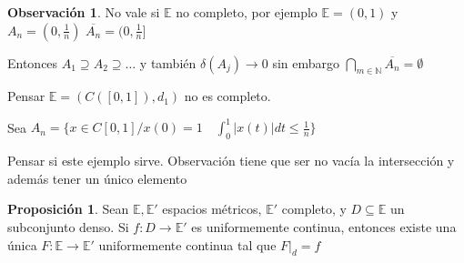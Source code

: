 \documentclass[12pt]{article}
\newcommand{\E}{\mathbb{E}}
\newcommand{\N}{\mathbb{N}}
\newcommand{\ra}{\rightarrow}
\newcommand{\ol}{\overline}
\theoremstyle{definition}
\newtheorem*{remark}{Observación}
\newtheorem{prop}{Proposición}
\begin{document}
\begin{remark}
  No vale si $\E$ no completo, por ejemplo $\E = (0,1)$ y $A_n = (0, \frac{1}{n})$ $\ol{A_n} = (0,\frac{1}{n}]$ 

  Entonces $A_1 \supseteq A_2 \supseteq \dots $ y también $\delta (A_j) \ra 0$ sin embargo $\bigcap_{m\in \N} \ol{A_n} = \emptyset$

  Pensar $\E = (C([0,1]),d_1)$ no es completo.

  Sea $A_n = \{x \in C[0,1] / x(0) = 1 \quad \int_0^1|x(t)|dt \leq \frac{1}{n}\}$ 

  Pensar si este ejemplo sirve. Observación tiene que ser no vacía la intersección y además tener un único elemento
\end{remark}
\begin{prop}
  Sean $\E ,\E '$ espacios métricos, $\E '$ completo, y $D \subseteq \E$ un subconjunto denso. Si $f : D \ra \E '$ es uniformemente continua, entonces existe una única $F : \E \ra \E '$ uniformemente continua tal que $F|_d = f$
\end{prop}
\end{document}
